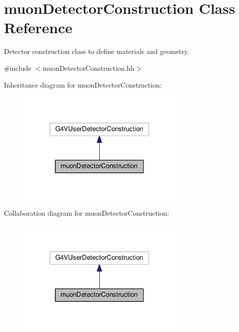 \hypertarget{classmuonDetectorConstruction}{}\section{muon\+Detector\+Construction Class Reference}
\label{classmuonDetectorConstruction}


Detector construction class to define materials and geometry.  




{\ttfamily \#include $<$muon\+Detector\+Construction.\+hh$>$}



Inheritance diagram for muon\+Detector\+Construction\+:\nopagebreak
\begin{figure}[H]
\begin{center}
\leavevmode
\includegraphics[width=230pt]{classmuonDetectorConstruction__inherit__graph}
\end{center}
\end{figure}


Collaboration diagram for muon\+Detector\+Construction\+:\nopagebreak
\begin{figure}[H]
\begin{center}
\leavevmode
\includegraphics[width=230pt]{classmuonDetectorConstruction__coll__graph}
\end{center}
\end{figure}
